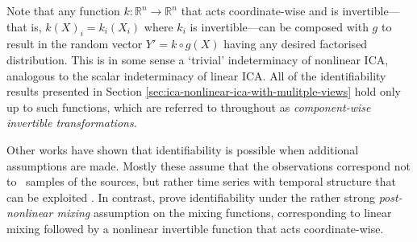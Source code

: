 %
%

Note that any function ${k}: \mathbb{R}^n \to \mathbb{R}^n$ that acts coordinate-wise and is invertible---that is, ${k}(X)_i = k_i(X_i)$ where $k_i$ is invertible---can be composed with ${g}$ to result in the random vector $Y'={k}\circ {g}(X)$ having any desired factorised distribution. 
This is in some sense a `trivial' indeterminacy of nonlinear ICA, analogous to the scalar indeterminacy of linear ICA.
All of the identifiability results presented in Section \ref{sec:ica-nonlinear-ica-with-mulitple-views} hold only up to such functions, which are referred to throughout as \emph{component-wise invertible transformations}.


Other works have shown that identifiability is possible when additional assumptions are made.
Mostly these assume that the observations correspond not to \iid~samples of the sources, but rather time series with temporal structure that can be exploited \citep{cardoso2001three, singer2008non, sprekeler2014extension}.
In contrast, \cite{taleb1999source} prove identifiability under the rather strong \emph{post-nonlinear mixing} assumption on the mixing functions, corresponding to linear mixing followed by a nonlinear invertible function that acts coordinate-wise.


